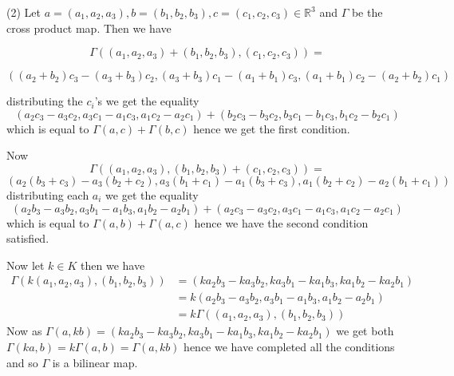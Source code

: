 \documentclass[letter,12pt]{article}
\newcommand{\R}{\mathbb{R}}
\begin{document}
(2) Let $a=(a_1,a_2,a_3),b=(b_1,b_2,b_3),c=(c_1,c_2,c_3)\in \R^3$ and $\Gamma$ be the cross product map. Then we have 

   \[ \Gamma((a_1,a_2,a_3)+(b_1,b_2,b_3),(c_1,c_2,c_3))=\]

   \[ ((a_2+b_2)c_3-(a_3+b_3)c_2,(a_3+b_3)c_1-(a_1+b_1)c_3,(a_1+b_1)c_2-(a_2+b_2)c_1)\]

   distributing the $c_i$'s we get the equality
   \[
    (a_2c_3-a_3c_2,a_3c_1-a_1c_3,a_1c_2-a_2c_1)+(b_2c_3-b_3c_2,b_3c_1-b_1c_3,b_1c_2-b_2c_1)
   \]
    which is equal to $\Gamma(a,c)+\Gamma(b,c)$ hence we get the first condition.

    Now 
    \[
        \Gamma((a_1,a_2,a_3),(b_1,b_2,b_3)+(c_1,c_2,c_3))=
    \]
    \[
        (a_2(b_3+c_3)-a_3(b_2+c_2),a_3(b_1+c_1)-a_1(b_3+c_3),a_1(b_2+c_2)-a_2(b_1+c_1))
    \]
    distributing each $a_i$ we get the equality
    \[
        (a_2b_3-a_3b_2,a_3b_1-a_1b_3,a_1b_2-a_2b_1)+(a_2c_3-a_3c_2,a_3c_1-a_1c_3,a_1c_2-a_2c_1)
    \]
    which is equal to $\Gamma(a,b)+\Gamma(a,c)$ hence we have the second condition satisfied.
    
    Now let $k\in K$  then we have 
    \begin{align}
        \Gamma(k(a_1,a_2,a_3),(b_1,b_2,b_3))&=  (ka_2b_3-ka_3b_2,ka_3b_1-ka_1b_3,ka_1b_2-ka_2b_1)\\
        &= k(a_2b_3-a_3b_2,a_3b_1-a_1b_3,a_1b_2-a_2b_1)\\
        &= k\Gamma((a_1,a_2,a_3),(b_1,b_2,b_3))
\end{align}
Now as $\Gamma(a,kb)=(ka_2b_3-ka_3b_2,ka_3b_1-ka_1b_3,ka_1b_2-ka_2b_1)$ we get both $\Gamma(ka,b)=k\Gamma(a,b)=\Gamma(a,kb)$ hence we have completed all the conditions and so $\Gamma$ is a bilinear map.
    

    
\end{document}
